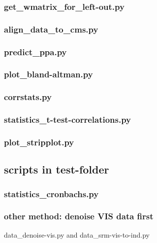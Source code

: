 \subsubsection{get\_wmatrix\_for\_left-out.py}


\subsubsection{align\_data\_to\_cms.py}


\subsubsection{predict\_ppa.py}


\subsubsection{plot\_bland-altman.py}


\subsubsection{corrstats.py}


\subsubsection{statistics\_t-test-correlations.py}


\subsubsection{plot\_stripplot.py}



\subsection{scripts in test-folder}


\subsubsection{statistics\_cronbachs.py}


\subsubsection{other method: denoise VIS data first}

data\_denoise-vis.py and data\_srm-vis-to-ind.py


